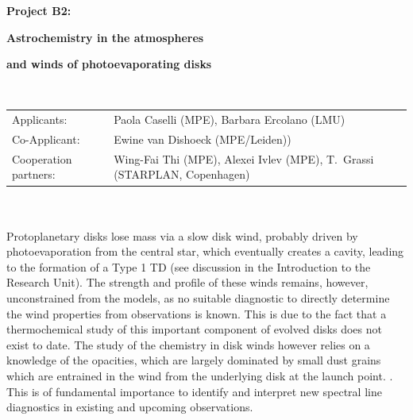 \documentclass[10pt,fleqn,twoside]{article}
\begin{document}
\newpage


\setcounter{page}{1}

\centerline{\huge\bf\Tcol
%
%
%
%
%
 Project B2:}
\vspace{1em}

\centerline{\LARGE\bf\Tcol Astrochemistry in the atmospheres}\vspace{0.3em}
\centerline{\LARGE\bf\Tcol and winds of photoevaporating disks}

%
%
%
%
%
\vskip1.0cm


\\
\begin{tabular}{ll}
{\textsf{Applicants:}}           & Paola Caselli (MPE), Barbara Ercolano (LMU) \\
{\textsf{Co-Applicant:}}         & Ewine van Dishoeck (MPE/Leiden))\\
{\textsf{Cooperation partners:}} & Wing-Fai Thi (MPE), Alexei Ivlev (MPE), T.~Grassi (STARPLAN, Copenhagen)\\
\end{tabular}


\vspace{1em}
 \\

\vspace{1em}
\\
Protoplanetary disks lose mass via a slow disk wind, probably driven
by photoevaporation from the central star, which eventually creates a
cavity, leading to the formation of a Type 1 TD (see discussion in the
Introduction to the Research Unit). The strength and profile of these
winds remains, however, unconstrained from the models, as no suitable
diagnostic to directly determine the wind properties from
observations is known. This is due to the fact that a thermochemical study of
this important component of evolved disks does not exist to date. The
study of the chemistry in disk winds however relies on a knowledge of
the opacities, which are 
largely dominated by small dust grains which are entrained in the wind
from the underlying disk at the launch point. . This is of fundamental importance to
identify and interpret new spectral line diagnostics in existing and
upcoming observations.  
\end{document}
